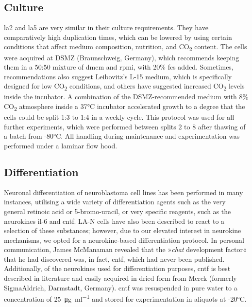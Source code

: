\begin{method}

\subsection{Culture}

\ac{la2} and \ac{la5} are very similar in their culture requirements. They have comparatively high duplication times, which can be lowered by using certain conditions that affect medium composition, nutrition, and CO\textsubscript{2} content. The cells were acquired at DSMZ (Braunschweig, Germany), which recommends keeping them in a 50:50 mixture of \ac{dmem} and \ac{rpmi}, with 20\% \ac{fcs} added. Sometimes, recommendations also suggest Leibovitz's L-15 medium, which is specifically designed for low CO\textsubscript{2} conditions, and others have suggested increased CO\textsubscript{2} levels inside the incubator. A combination of the DSMZ-recommended medium with 8\% CO\textsubscript{2} atmosphere inside a 37°C incubator accelerated growth to a degree that the cells could be split 1:3 to 1:4 in a weekly cycle. This protocol was used for all further experiments, which were performed between splits 2 to 8 after thawing of a batch from -80°C. All handling during maintenance and experimentation was performed under a laminar flow hood.

\subsection{Differentiation}

Neuronal differentiation of neuroblastoma cell lines has been performed in many instances, utilising a wide variety of differentiation agents such as the very general retinoic acid or 5-bromo-uracil, or very specific reagents, such as the neurokines \ac{il}-6 and \ac{cntf}.\cite{} LA-N cells have also been described to react to a selection of these substances; however, due to our elevated interest in neurokine mechanisms, we opted for a neurokine-based differentiation protocol. In personal communication, James McManaman revealed that the »\textit{\ac{chat}} development factor« that he had discovered\cite{McManaman1988} was, in fact, \ac{cntf}, which had never been published. Additionally, of the neurokines used for differentiation purposes, \ac{cntf} is best described in literature and easily acquired in dried form from Merck (formerly SigmaAldrich, Darmstadt, Germany). \ac{cntf} was resuspended in pure water to a concentration of \SI{25}{\micro\gram\per\milli\litre} and stored for experimentation in aliquots at -20°C.


\end{method}
